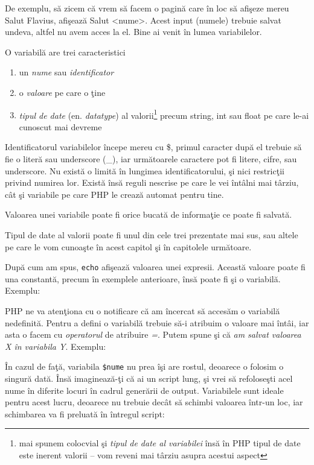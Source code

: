 De exemplu, să zicem că vrem să facem o pagină care în loc să afişeze
mereu {\glqq}Salut Flavius{\grqq}, afişează {\glqq}Salut <nume>{\grqq}. Acest input (numele) trebuie
salvat undeva, altfel nu avem acces la el. Bine ai venit în lumea variabilelor.

O variabilă are trei caracteristici
\begin{enumerate}
\item un \textsl{nume} sau \textsl{identificator}
\item o \textsl{valoare} pe care o ţine
\item \textsl{tipul de date} (en. \textsl{datatype}) al valorii\footnote{mai
spunem colocvial şi \textit{tipul de date al variabilei} însă în PHP tipul
de date este inerent valorii -- vom reveni mai târziu asupra acestui aspect} precum
string, int sau float pe care le-ai cunoscut mai devreme
\end{enumerate}

Identificatorul variabilelor începe mereu cu \$, primul caracter după el
trebuie să fie o literă sau underscore (\_), iar următoarele
caractere pot fi litere, cifre, sau underscore.
Nu există o limită în lungimea identificatorului, şi nici restricţii privind
numirea lor. Există însă reguli nescrise pe care le vei întâlni mai târziu,
cât şi variabile pe care PHP le crează automat pentru tine.

Valoarea unei variabile poate fi orice bucată de informaţie ce poate
fi salvată.

Tipul de date al valorii poate fi unul din cele trei prezentate mai sus,
sau altele pe care le vom cunoaşte în acest capitol şi în capitolele următoare.

După cum am spus, \texttt{echo} afişează valoarea unei expresii.
Această valoare poate fi una constantă, precum în exemplele anterioare,
însă poate fi şi o variabilă. Exemplu:

PHP ne va atenţiona cu o notificare că am încercat să accesăm o variabilă
nedefinită. Pentru a defini o variabilă trebuie să-i atribuim o valoare
mai întâi, iar asta o facem cu \textsl{operatorul} de atribuire \textsl{=}.
Putem spune şi că \textit{am salvat valoarea X în variabila Y}. Exemplu:



În cazul de faţă, variabila \texttt{\$nume} nu prea îşi are rostul, deoarece o
folosim o singură dată. Însă imaginează-ţi că ai un script lung,
şi vrei să refoloseşti acel nume în diferite locuri în cadrul generării de
output. Variabilele sunt ideale pentru acest lucru, deoarece nu trebuie
decât să schimbi valoarea într-un loc, iar schimbarea va fi preluată în
întregul script:


